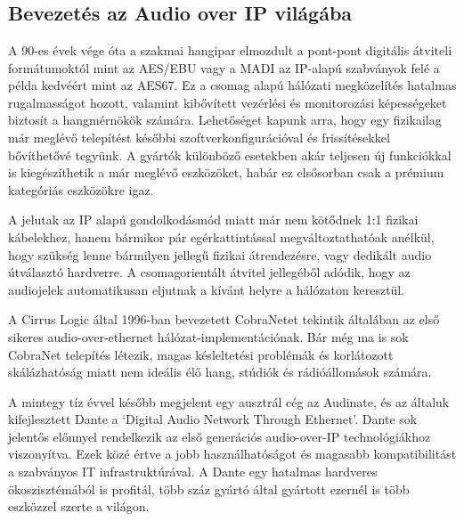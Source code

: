 \chapter{\AudioOverIp}
\section{Bevezetés az Audio over IP világába}
A 90-es évek vége óta a szakmai hangipar elmozdult a pont-pont digitális
átviteli formátumoktól mint az AES/EBU vagy a MADI az IP-alapú szabványok felé a példa kedvéért mint az AES67. 
Ez a csomag alapú hálózati megközelítés hatalmas rugalmasságot
hozott, valamint kibővített vezérlési és monitorozási képességeket biztosít a
hangmérnökök számára. Lehetőséget kapunk arra, hogy egy fizikailag már meglévő
telepítést későbbi szoftverkonfigurációval és frissítésekkel bővíthetővé tegyünk.
A gyártók különböző esetekben akár teljesen új funkciókkal is kiegészíthetik a már meglévő eszközöket,
habár ez elsősorban csak a prémium kategóriás eszközökre igaz.

A jelutak az IP alapú gondolkodásmód miatt már nem kötődnek 1:1 fizikai kábelekhez, hanem
bármikor pár egérkattintással megváltoztathatóak anélkül, hogy szükség lenne bármilyen
jellegű fizikai átrendezésre, vagy dedikált audio útválasztó hardverre. 
A csomagorientált átvitel jellegéből adódik, hogy az audiojelek automatikusan eljutnak 
a kívánt helyre a hálózaton keresztül.

A Cirrus Logic által 1996-ban bevezetett CobraNetet
tekintik általában az első sikeres audio-over-ethernet hálózat-implementációnak.
Bár még ma is sok CobraNet telepítés létezik, magas késleltetési problémák és korlátozott skálázhatóság
miatt nem ideális élő hang, stúdiók és rádióállomások számára.

A mintegy tíz évvel később megjelent egy ausztrál cég az Audinate, és az általuk kifejlesztett
Dante a `Digital Audio Network Through Ethernet'. Dante sok jelentős
előnnyel rendelkezik az első generációs audio-over-IP technológiákhoz viszonyítva.
Ezek közé értve a jobb használhatóságot és magasabb kompatibilitást a szabványos
IT infrastruktúrával. A Dante egy hatalmas hardveres ökoszisztémából is profitál, 
több száz gyártó által gyártott ezernél is több eszközzel szerte a világon.

